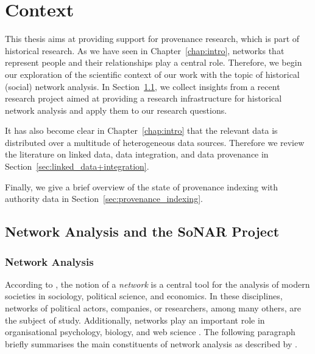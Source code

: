 \chapter{Context}
\label{chap:rel_work}
\label{chap:context}

This thesis aims at providing support for provenance research, which is part of historical research.
As we have seen in Chapter~\ref{chap:intro}, networks that represent
people and their relationships play a central role.
Therefore, we begin our exploration of the scientific context of our work
with the topic of historical (social) network analysis.
In Section~\ref{sec:HNA+SoNAR}, we collect insights from a recent research project
aimed at providing a research infrastructure for historical network analysis
and apply them to our research questions.

It has also become clear in Chapter~\ref{chap:intro} that the relevant data is distributed 
over a multitude of heterogeneous data sources.
Therefore we review 
the literature on linked data, data integration,
and data provenance in Section~\ref{sec:linked_data+integration}.

Finally, we give a brief overview of the state of provenance indexing
with authority data in Section~\ref{sec:provenance_indexing}.

\section{Network Analysis and the SoNAR Project}
\label{sec:HNA+SoNAR}

\subsection{Network Analysis}

According to \textcite{Jansen2003},
the notion of a \emph{network} is a central tool for the analysis
of modern societies in sociology, political science, and economics.
In these disciplines, networks of political actors, companies, or researchers,
among many others, are the subject of study.
Additionally, networks play an important role
in organisational psychology, biology, and web science \autocite{WikiSNAGerman,WikiNetworkAnalysis}.
The following
paragraph briefly summarises the main constituents of network analysis
as described by \textcite{Jansen2003}.

